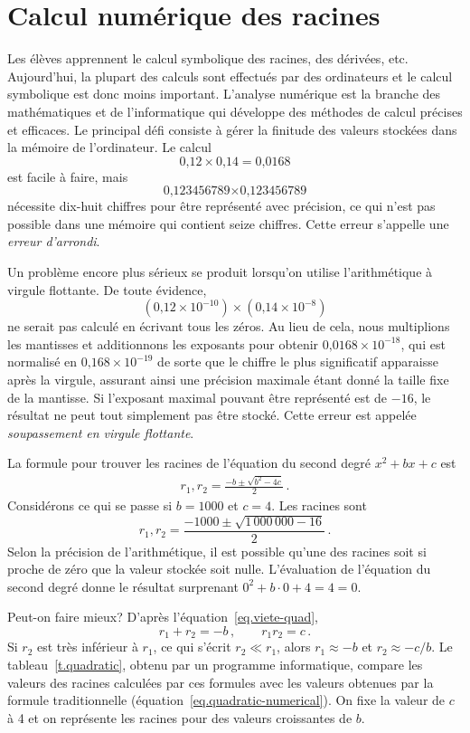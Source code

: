 \section{Calcul numérique des racines}\label{s.numerical}


Les élèves apprennent le calcul symbolique des racines, des dérivées, etc. Aujourd'hui, la plupart des calculs sont effectués par des ordinateurs et le calcul symbolique est donc moins important. L'analyse numérique est la branche des mathématiques et de l'informatique qui développe des méthodes de calcul précises et efficaces. Le principal défi consiste à gérer la finitude des valeurs stockées dans la mémoire de l'ordinateur. Le calcul 
\[\mbox{0,12}\times \mbox{0,14}=\mbox{0,0168}\]
est facile à faire, mais 
\[
\mbox{0,123456789}\times \mbox{0,123456789}\]
nécessite dix-huit chiffres pour être représenté avec précision, ce qui n'est pas possible dans une mémoire qui contient seize chiffres. Cette erreur s'appelle une \emph{erreur d'arrondi}.

Un problème encore plus sérieux se produit  lorsqu'on utilise l'arithmétique à virgule flottante. De toute évidence,
\[(\mbox{0,12}\times 10^{-10})\times (\mbox{0,14}\times 10^{-8})\]
ne serait pas calculé en écrivant tous les zéros. Au lieu de cela, nous multiplions les mantisses et additionnons les exposants pour obtenir $\mbox{0,0168}\times 10^{-18}$, qui est normalisé en $\mbox{0,168}\times 10^{-19}$ de sorte que le chiffre le plus significatif apparaisse après la virgule, assurant ainsi une précision maximale étant donné la taille fixe de la mantisse. Si l'exposant maximal pouvant être représenté est de $-16$, le résultat ne peut tout simplement pas être stocké. Cette erreur est appelée \emph{soupassement en virgule flottante}.



La formule pour trouver les racines de l'équation du second degré $x^2+bx+c$ est 
\begin{align}
r_1, r_2 = \frac{-b\pm\sqrt{b^2-4c}}{2}\,.\label{eq.quadratic-numerical}
\end{align}
Considérons ce qui se passe si $b=1000$ et $c=4$. Les racines sont 
\[
r_1, r_2 = \frac{-1000\pm\sqrt{1\,000\,000-16}}{2}\,.
\]
Selon la précision de l'arithmétique, il est possible qu'une des racines soit si proche de zéro que la valeur stockée soit nulle. L'évaluation de l'équation du second degré donne le résultat surprenant $0^2+b\cdot 0 +4= 4= 0$.

Peut-on faire mieux? D'après l'équation~\ref{eq.viete-quad},
\[
r_1+r_2 = -b\,,\quad\quad r_1r_2=c\,.
\]
Si $r_2$ est très inférieur à $r_1$, ce qui s'écrit $r_2\ll r_1$, alors $r_1\approx -b$ et $r_2\approx -c/b$. Le tableau~\ref{t.quadratic}, obtenu par un programme informatique, compare les valeurs des racines calculées par ces formules avec les valeurs obtenues par la formule traditionnelle (équation~\ref{eq.quadratic-numerical}). On fixe la valeur de $c$  à 4 et on représente les racines pour des valeurs croissantes de $b$.

